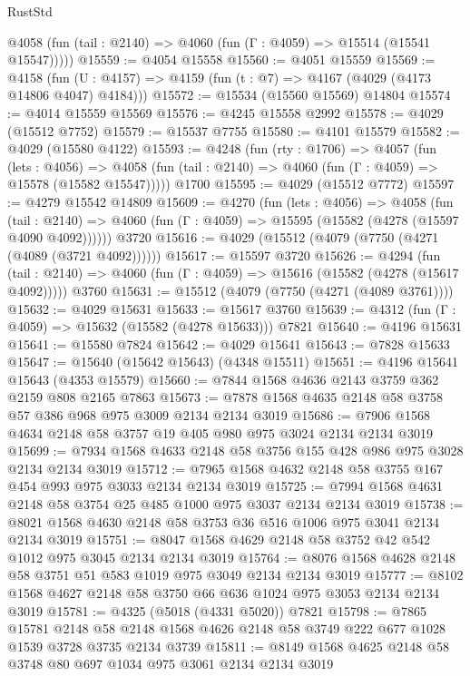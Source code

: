 \begin{lexlean}{RustStd}
\begin{coremodule}
      @4058 (fun (tail : @2140) => @4060 (fun (Γ : @4059) => @15514 (@15541 @15547)))))
@15559 := @4054 @15558
@15560 := @4051 @15559
@15569 := @4158
    (fun (U : @4157) => @4159 (fun (t : @7) => @4167 (@4029 (@4173 @14806 @4047) @4184)))
@15572 := @15534 (@15560 @15569) @14804
@15574 := @4014 @15559 @15569
@15576 := @4245 @15558 @2992
@15578 := @4029 (@15512 @7752)
@15579 := @15537 @7755
@15580 := @4101 @15579
@15582 := @4029 (@15580 @4122)
@15593 := @4248
    (fun (rty : @1706) =>
    @4057
      (fun (lets : @4056) =>
      @4058 (fun (tail : @2140) => @4060 (fun (Γ : @4059) => @15578 (@15582 @15547)))))
    @1700
@15595 := @4029 (@15512 @7772)
@15597 := @4279 @15542 @14809
@15609 := @4270
    (fun (lets : @4056) =>
    @4058
      (fun (tail : @2140) =>
      @4060 (fun (Γ : @4059) => @15595 (@15582 (@4278 (@15597 @4090 @4092))))))
    @3720
@15616 := @4029 (@15512 (@4079 (@7750 (@4271 (@4089 (@3721 @4092))))))
@15617 := @15597 @3720
@15626 := @4294
    (fun (tail : @2140) => @4060 (fun (Γ : @4059) => @15616 (@15582 (@4278 (@15617 @4092)))))
    @3760
@15631 := @15512 (@4079 (@7750 (@4271 (@4089 @3761))))
@15632 := @4029 @15631
@15633 := @15617 @3760
@15639 := @4312 (fun (Γ : @4059) => @15632 (@15582 (@4278 @15633))) @7821
@15640 := @4196 @15631
@15641 := @15580 @7824
@15642 := @4029 @15641
@15643 := @7828 @15633
@15647 := @15640 (@15642 @15643) (@4348 @15511)
@15651 := @4196 @15641 @15643 (@4353 @15579)
@15660 := @7844 @1568 @4636 @2143 @3759 @362 @2159 @808 @2165 @7863
@15673 := @7878 @1568 @4635 @2148 @58 @3758 @57 @386 @968 @975 @3009 @2134 @2134 @3019
@15686 := @7906 @1568 @4634 @2148 @58 @3757 @19 @405 @980 @975 @3024 @2134 @2134 @3019
@15699 := @7934 @1568 @4633 @2148 @58 @3756 @155 @428 @986 @975 @3028 @2134 @2134 @3019
@15712 := @7965 @1568 @4632 @2148 @58 @3755 @167 @454 @993 @975 @3033 @2134 @2134 @3019
@15725 := @7994 @1568 @4631 @2148 @58 @3754 @25 @485 @1000 @975 @3037 @2134 @2134 @3019
@15738 := @8021 @1568 @4630 @2148 @58 @3753 @36 @516 @1006 @975 @3041 @2134 @2134 @3019
@15751 := @8047 @1568 @4629 @2148 @58 @3752 @42 @542 @1012 @975 @3045 @2134 @2134 @3019
@15764 := @8076 @1568 @4628 @2148 @58 @3751 @51 @583 @1019 @975 @3049 @2134 @2134 @3019
@15777 := @8102 @1568 @4627 @2148 @58 @3750 @66 @636 @1024 @975 @3053 @2134 @2134 @3019
@15781 := @4325 (@5018 (@4331 @5020)) @7821
@15798 := @7865
    @15781
    @2148
    @58
    @2148
    @1568
    @4626
    @2148
    @58
    @3749
    @222
    @677
    @1028
    @1539
    @3728
    @3735
    @2134
    @3739
@15811 := @8149 @1568 @4625 @2148 @58 @3748 @80 @697 @1034 @975 @3061 @2134 @2134 @3019

\end{coremodule}
\end{lexlean}
